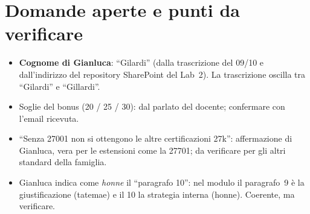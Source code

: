 \section{Domande aperte e punti da verificare}
\begin{verifica}
\begin{itemize}
  \item \textbf{Cognome di Gianluca}: ``Gilardi'' (dalla trascrizione del 09/10 e dall'indirizzo del
    repository SharePoint del Lab~2). La trascrizione oscilla tra ``Gilardi'' e ``Gillardi''.
  \item Soglie del bonus (20 / 25 / 30): dal parlato del docente; confermare con l'email ricevuta.
  \item ``Senza 27001 non si ottengono le altre certificazioni 27k'': affermazione di Gianluca, vera
    per le estensioni come la 27701; da verificare per gli altri standard della famiglia.
  \item Gianluca indica come \emph{honne} il ``paragrafo 10'': nel modulo il paragrafo~9 è la
    giustificazione (tatemae) e il 10 la strategia interna (honne). Coerente, ma verificare.
\end{itemize}
\end{verifica}
